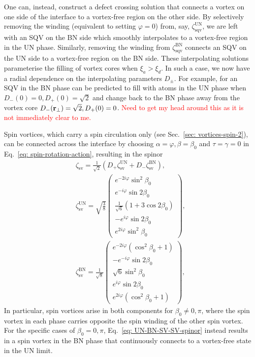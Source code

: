 One can, instead, construct a defect crossing solution that connects a vortex
on one side of the interface to a vortex-free region on the other side.
By selectively removing the winding (equivalent to setting \(\varphi=0\)) from,
say, \(\zeta^\text{UN}_\text{sqv}\), we are left with an SQV on the BN side
which smoothly interpolates to a vortex-free region in the UN phase.
Similarly, removing the winding from \(\zeta^\text{BN}_\text{sqv}\) connects an
SQV on the UN side to a vortex-free region on the BN side.
These interpolating solutions parameterise the filling of vortex cores when
\(\xi_a > \xi_d\).
In such a case, we now have a radial dependence on the interpolating parameters
\(D_{\pm}\).
For example, for an SQV in the BN phase can be predicted to fill with atoms in
the UN phase when \(D_-(0) = 0, D_+(0) = \sqrt{2}\) and change back to the BN
phase away from the vortex core \(D_-(\vb{r}_\perp) = \sqrt{2}, D_+(0) = 0\).
\textcolor{red}{Need to get my head around this as it is not immediately clear
    to me.}

Spin vortices, which carry a spin circulation only
(see Sec.~\ref{sec: vortices-spin-2}), can be connected across the interface by
choosing \(\alpha=\varphi, \beta=\beta_0 \) and \(\tau = \gamma = 0\) in
Eq.~\eqref{eq: spin-rotation-action}, resulting in the spinor
\begin{align}\label{eq: UN-BN-SV-SV-spinor}
     & \zeta_\text{sv} =  \frac{1}{\sqrt{2}}\left( D_+\zeta^\text{UN}_\text{sv}
    + D_-\zeta^\text{BN}_\text{sv}\right),
    \\
     & \zeta^\text{UN}_\text{sv} =
    \sqrt{\frac38}
    \begin{pmatrix}
        e^{-2i\varphi}\sin^2\beta_0                     \\
        e^{-i\varphi}\sin 2 \beta _0                    \\
        \frac{1}{\sqrt{6}}\left(1+3\cos 2\beta_0\right) \\
        -e^{i\varphi} \sin 2 \beta _0                   \\
        e^{2i\varphi}\sin^2\beta_0
    \end{pmatrix}, \label{eq: UN-SV-spinor}               \\
     & \zeta^\text{BN}_\text{sv} =
    \frac{1}{\sqrt{8}}
    \begin{pmatrix}
        e^{-2i\varphi}\left(\cos^2\beta_0 + 1\right) \\
        - e^{-i\varphi}\sin 2 \beta _0               \\
        \sqrt{6}\sin^2\beta_0                        \\
        e^{i\varphi}\sin 2 \beta _0                  \\
        e^{2i\varphi}\left(\cos^2\beta_0 + 1\right)
    \end{pmatrix},
\end{align}
In particular, spin vortices arise in both components for
\(\beta_0 \neq 0, \pi \), where the spin vortex in each phase carries opposite
the spin winding of the other spin vortex.
For the specific cases of \(\beta_0 = 0, \pi \),
Eq.~\eqref{eq: UN-BN-SV-SV-spinor} instead results in a spin vortex in the BN
phase that continuously connects to a vortex-free state in the UN limit.

